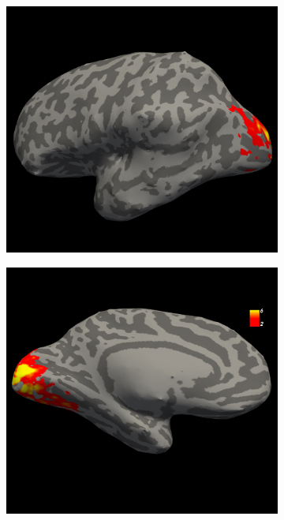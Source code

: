 \documentclass[5p,authoryear]{elsarticle}
\begin{document}
\begin{figure}
\begin{subfigure}{0.2\textwidth}
\caption{}
\label{fig:s3-lh-medial-sensitivity}
\end{subfigure}
\begin{subfigure}{0.2\textwidth}
\centering
\includegraphics[width=\textwidth]{figures/s3-lh-lateral-zscore}
\caption{}
\label{fig:s3-lh-lateral-zscore}
\end{subfigure}
\begin{subfigure}{0.2\textwidth}
\centering
\includegraphics[width=\textwidth]{figures/s3-lh-medial-zscore}

\end{subfigure}
\end{figure}
\end{document}
